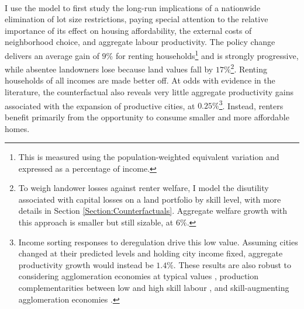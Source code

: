 \documentclass[12pt]{article}
\begin{document}
	\paragraph*{}
	I use the model to first study the long-run implications of a nationwide elimination of lot size restrictions, paying special attention to the relative importance of its effect on housing affordability, the external costs of neighborhood choice, and aggregate labour productivity. The policy change delivers an average gain of $9 \%$ for renting households\footnote{This is measured using the population-weighted equivalent variation and expressed as a percentage of income.} and is strongly progressive, while absentee landowners lose because land values fall by $17 \%$\footnote{To weigh landower losses against renter welfare, I model the disutility associated with capital losses on a land portfolio by skill level, with more details in Section \ref{Section:Counterfactuals}. Aggregate welfare growth with this approach is smaller but still sizable, at $6 \%$. }. Renting households of all incomes are made better off. At odds with evidence in the literature, the counterfactual also reveals very little aggregate productivity gains associated with the expansion of productive cities, at $0.25 \%$\footnote{Income sorting responses to deregulation drive this low value. Assuming cities changed at their predicted levels and holding city income fixed, aggregate productivity growth would instead be $1.4\%$. These results are also robust to considering agglomeration economies at typical values \citep{Combes_review}, production complementarities between low and high skill labour \citep{card}, and skill-augmenting agglomeration economies \citep{diamond2016, ineqincreased}.}. Instead, renters benefit primarily from the opportunity to consume smaller and more affordable homes.
	
\end{document}
